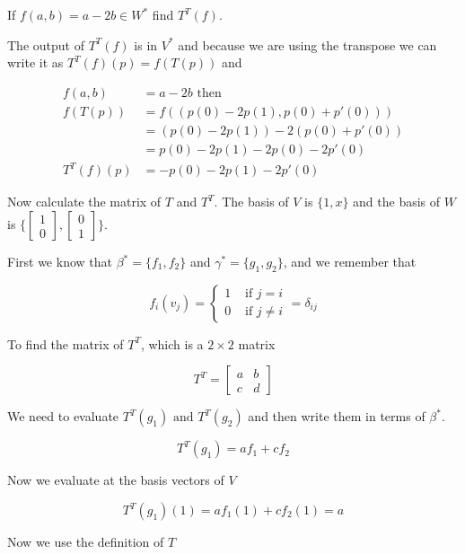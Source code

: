 If \(f(a,b) = a - 2b \in W^*\) find \(T^T(f)\).

The output of \(T^T(f)\) is in \(V^*\) and because we are using the transpose we can write it
as \(T^T(f)(p) = f(T(p))\) and

\begin{align*}
    f(a,b)    & = a - 2b \text{ then }             \\
    f(T(p))   & = f((p(0) - 2p(1), p(0) + p'(0)))  \\
              & = (p(0) - 2p(1)) - 2(p(0) + p'(0)) \\
              & = p(0) - 2p(1) - 2p(0) - 2p'(0)    \\
    T^T(f)(p) & = -p(0) - 2p(1) - 2p'(0)
\end{align*}

Now calculate the matrix of \(T\) and \(T^T\). The basis of \(V\) is \(\{1, x\}\) and the basis of \(W\)
is \(\{\begin{bmatrix} 1 \\ 0 \end{bmatrix}, \begin{bmatrix} 0 \\ 1 \end{bmatrix}\}\).

First we know that \(\beta^* = \{ f_1, f_2 \}\) and \(\gamma^* = \{ g_1, g_2 \}\), and we remember that

\[
    f_i(v_j) = \begin{cases}
        1 & \text{ if } j = i   \\
        0 & \text{ if } j \ne i
    \end{cases} = \delta_{ij}
\]

To find the matrix of \(T^T\), which is a \(2 \times 2\) matrix

\[
    T^T =
    \begin{bmatrix}
        a & b \\
        c & d
    \end{bmatrix}
\]

We need to evaluate \(T^T(g_1) \text{ and } T^T(g_2)\) and then write them in terms of \(\beta^*\).

\[
    T^T(g_1) = a f_1 + c f_2
\]

Now we evaluate at the basis vectors of \(V\)

\[
    T^T(g_1)(1) = a f_1(1) + c f_2(1) = a
\]

Now we use the definition of \(T\)

